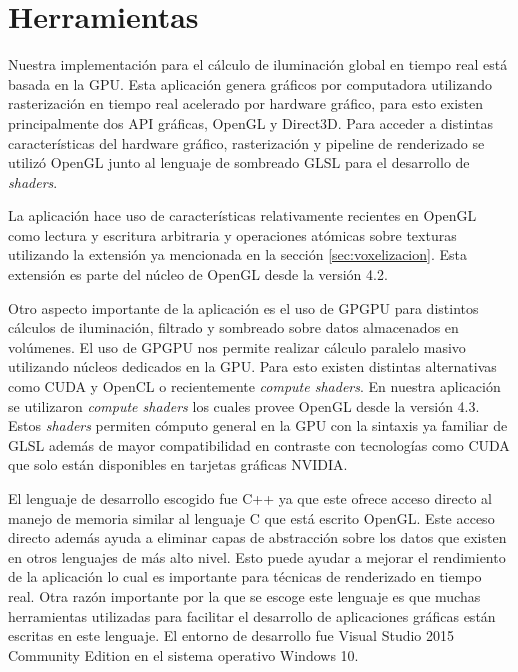 \section{Herramientas}
Nuestra implementación para el cálculo de iluminación global en tiempo real está basada en la \ac{GPU}. Esta aplicación genera gráficos por computadora utilizando rasterización en tiempo real acelerado por hardware gráfico, para esto existen principalmente dos API gráficas, OpenGL y Direct3D. Para acceder a distintas características del hardware gráfico, rasterización y pipeline de renderizado se utilizó OpenGL junto al lenguaje de sombreado GLSL para el desarrollo de \emph{shaders}. 

La aplicación hace uso de características relativamente recientes en OpenGL como lectura y escritura arbitraria y operaciones atómicas sobre texturas utilizando la extensión ya mencionada en la sección \ref{sec:voxelizacion}. Esta extensión es parte del núcleo de OpenGL desde la versión 4.2. 

Otro aspecto importante de la aplicación es el uso de \ac{GPGPU} para distintos cálculos de iluminación, filtrado y sombreado sobre datos almacenados en volúmenes. El uso de \ac{GPGPU} nos permite realizar cálculo paralelo masivo utilizando núcleos dedicados en la \ac{GPU}. Para esto existen distintas alternativas como CUDA y OpenCL o recientemente \emph{compute shaders}. En nuestra aplicación se utilizaron \emph{compute shaders} los cuales provee OpenGL desde la versión 4.3. Estos \emph{shaders} permiten cómputo general en la GPU con la sintaxis ya familiar de GLSL además de mayor compatibilidad en contraste con tecnologías como CUDA que solo están disponibles en tarjetas gráficas NVIDIA.

El lenguaje de desarrollo escogido fue C++ ya que este ofrece acceso directo al manejo de memoria similar al lenguaje C que está escrito OpenGL. Este acceso directo además ayuda a eliminar capas de abstracción sobre los datos que existen en otros lenguajes de más alto nivel. Esto puede ayudar a mejorar el rendimiento de la aplicación lo cual es importante para técnicas de renderizado en tiempo real. Otra razón importante por la que se escoge este lenguaje es que muchas herramientas utilizadas para facilitar el desarrollo de aplicaciones gráficas están escritas en este lenguaje. El entorno de desarrollo fue Visual Studio 2015 Community Edition en el sistema operativo Windows 10.

